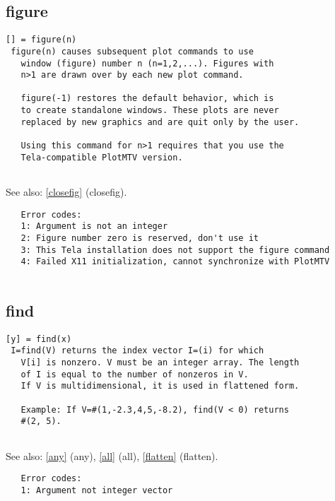 \documentclass[a4paper]{article}
\begin{document}
\subsection{figure\label{figure}}

\begin{tscreen}
\begin{verbatim}
[] = figure(n)
 figure(n) causes subsequent plot commands to use
   window (figure) number n (n=1,2,...). Figures with
   n>1 are drawn over by each new plot command.
   
   figure(-1) restores the default behavior, which is
   to create standalone windows. These plots are never
   replaced by new graphics and are quit only by the user.
   
   Using this command for n>1 requires that you use the
   Tela-compatible PlotMTV version.
   
\end{verbatim}

See also: \ref{closefig} {(closefig)}.
\begin{verbatim}
   Error codes:
   1: Argument is not an integer
   2: Figure number zero is reserved, don't use it
   3: This Tela installation does not support the figure command
   4: Failed X11 initialization, cannot synchronize with PlotMTV
   
\end{verbatim}
\end{tscreen}





\subsection{find\label{find}}

\begin{tscreen}
\begin{verbatim}
[y] = find(x)
 I=find(V) returns the index vector I=(i) for which
   V[i] is nonzero. V must be an integer array. The length
   of I is equal to the number of nonzeros in V.
   If V is multidimensional, it is used in flattened form.

   Example: If V=#(1,-2.3,4,5,-8.2), find(V < 0) returns
   #(2, 5).
   
\end{verbatim}

See also: \ref{any} {(any)}, \ref{all} {(all)}, \ref{flatten} {(flatten)}.
\begin{verbatim}
   Error codes:
   1: Argument not integer vector 
\end{verbatim}
\end{tscreen}
\end{document}
